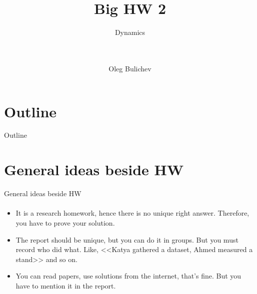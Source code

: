 \documentclass[aspectratio=169]{beamer}
\title[Theoretical Mechanics]{Big HW 2} %
\subtitle{ Dynamics \\
\  \\ \  \
         } %
\author{Oleg Bulichev}
\newcommand{\fbckg}[1]{\usebackgroundtemplate{\texttt{[image: \#1]}}}%
\begin{document}
\setlength{\abovedisplayskip}{0pt}
\setlength{\belowdisplayskip}{0pt}
\setlength{\abovedisplayshortskip}{0pt}
\setlength{\belowdisplayshortskip}{0pt}

\fbckg{fibeamer/figs/title_page.png}

\fbckg{fibeamer/figs/common.png}

\section*{Outline}
\begin{frame}[t]{Outline}
\framesubtitle{}
\tableofcontents
\end{frame}

\section{General ideas beside HW}
\begin{frame}[t]{General ideas beside HW}
\framesubtitle{}
\vspace{-0.4cm}
  \begin{itemize}
    \item It is a research homework, hence there is no unique right answer. Therefore, you have to prove your solution.
    \item The report should be unique, but you can do it in groups. But you must record who did what. Like, <<Katya gathered a dataset, Ahmed measured a stand>> and so on.
    \item You can read papers, use solutions from the internet, that's fine. But you have to mention it in the report.
  \end{itemize}
\end{frame}
\end{document}
